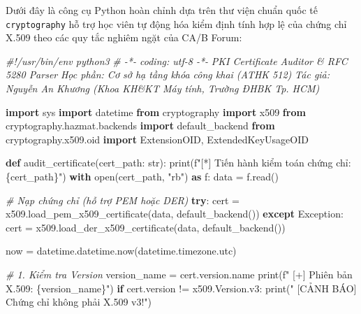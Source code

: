 \documentclass[
]{article}
\newenvironment{Shaded}{}{}
\newcommand{\BuiltInTok}[1]{\textcolor[rgb]{0.00,0.50,0.00}{#1}}
\newcommand{\CommentTok}[1]{\textcolor[rgb]{0.38,0.63,0.69}{\textit{#1}}}
\newcommand{\ControlFlowTok}[1]{\textcolor[rgb]{0.00,0.44,0.13}{\textbf{#1}}}
\newcommand{\ImportTok}[1]{\textcolor[rgb]{0.00,0.50,0.00}{\textbf{#1}}}
\newcommand{\KeywordTok}[1]{\textcolor[rgb]{0.00,0.44,0.13}{\textbf{#1}}}
\newcommand{\NormalTok}[1]{#1}
\newcommand{\OperatorTok}[1]{\textcolor[rgb]{0.40,0.40,0.40}{#1}}
\newcommand{\PreprocessorTok}[1]{\textcolor[rgb]{0.74,0.48,0.00}{#1}}
\newcommand{\SpecialCharTok}[1]{\textcolor[rgb]{0.25,0.44,0.63}{#1}}
\newcommand{\SpecialStringTok}[1]{\textcolor[rgb]{0.73,0.40,0.53}{#1}}
\newcommand{\StringTok}[1]{\textcolor[rgb]{0.25,0.44,0.63}{#1}}
\begin{document}
Dưới đây là công cụ Python hoàn chỉnh dựa trên thư viện chuẩn quốc tế
\texttt{cryptography} hỗ trợ học viên tự động hóa kiểm định tính hợp lệ
của chứng chỉ X.509 theo các quy tắc nghiêm ngặt của CA/B Forum:

\begin{Shaded}
\begin{Highlighting}[]
\CommentTok{\#!/usr/bin/env python3}
\CommentTok{\# {-}*{-} coding: utf{-}8 {-}*{-}}
\CommentTok{\textquotesingle{}\textquotesingle{}\textquotesingle{}}
\CommentTok{PKI Certificate Auditor \& RFC 5280 Parser}
\CommentTok{Học phần: Cơ sở hạ tầng khóa công khai (ATHK 512)}
\CommentTok{Tác giả: Nguyễn An Khương (Khoa KH\&KT Máy tính, Trường ĐHBK Tp. HCM)}
\CommentTok{\textquotesingle{}\textquotesingle{}\textquotesingle{}}

\ImportTok{import}\NormalTok{ sys}
\ImportTok{import}\NormalTok{ datetime}
\ImportTok{from}\NormalTok{ cryptography }\ImportTok{import}\NormalTok{ x509}
\ImportTok{from}\NormalTok{ cryptography.hazmat.backends }\ImportTok{import}\NormalTok{ default\_backend}
\ImportTok{from}\NormalTok{ cryptography.x509.oid }\ImportTok{import}\NormalTok{ ExtensionOID, ExtendedKeyUsageOID}

\KeywordTok{def}\NormalTok{ audit\_certificate(cert\_path: }\BuiltInTok{str}\NormalTok{):}
    \BuiltInTok{print}\NormalTok{(}\SpecialStringTok{f"[*] Tiến hành kiểm toán chứng chỉ: }\SpecialCharTok{\{}\NormalTok{cert\_path}\SpecialCharTok{\}}\SpecialStringTok{"}\NormalTok{)}
    \ControlFlowTok{with} \BuiltInTok{open}\NormalTok{(cert\_path, }\StringTok{"rb"}\NormalTok{) }\ImportTok{as}\NormalTok{ f:}
\NormalTok{        data }\OperatorTok{=}\NormalTok{ f.read()}

    \CommentTok{\# Nạp chứng chỉ (hỗ trợ PEM hoặc DER)}
    \ControlFlowTok{try}\NormalTok{:}
\NormalTok{        cert }\OperatorTok{=}\NormalTok{ x509.load\_pem\_x509\_certificate(data, default\_backend())}
    \ControlFlowTok{except} \PreprocessorTok{Exception}\NormalTok{:}
\NormalTok{        cert }\OperatorTok{=}\NormalTok{ x509.load\_der\_x509\_certificate(data, default\_backend())}

\NormalTok{    now }\OperatorTok{=}\NormalTok{ datetime.datetime.now(datetime.timezone.utc)}

    \CommentTok{\# 1. Kiểm tra Version}
\NormalTok{    version\_name }\OperatorTok{=}\NormalTok{ cert.version.name}
    \BuiltInTok{print}\NormalTok{(}\SpecialStringTok{f" [+] Phiên bản X.509: }\SpecialCharTok{\{}\NormalTok{version\_name}\SpecialCharTok{\}}\SpecialStringTok{"}\NormalTok{)}
    \ControlFlowTok{if}\NormalTok{ cert.version }\OperatorTok{!=}\NormalTok{ x509.Version.v3:}
        \BuiltInTok{print}\NormalTok{(}\StringTok{"  [CẢNH BÁO] Chứng chỉ không phải X.509 v3!"}\NormalTok{)}


\end{Highlighting}
\end{Shaded}
\end{document}
